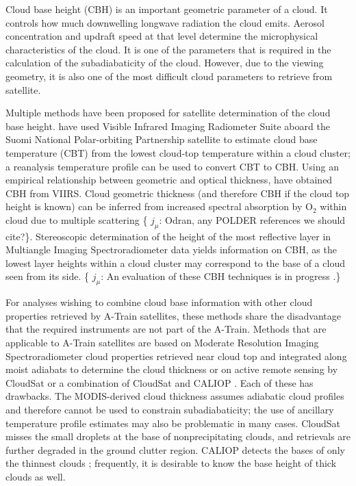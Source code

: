 \documentclass[essd,manuscript]{copernicus}\usepackage[]{graphicx}\usepackage[]{color}
\newcommand{\hlnum}[1]{\textcolor[rgb]{0.686,0.059,0.569}{#1}}%
\newcommand\comment[2]{\{\hlnum{ \textit{#1}: #2}\}}
\newcommand\commentjm[1]{\comment{$j_\mu$}{#1}}
\begin{document}
\introduction  %
\label{sec:intro}
Cloud base height (CBH) is an important geometric parameter of a cloud.  It
controls how much downwelling longwave radiation the cloud emits.  Aerosol
concentration and updraft speed at that level determine the microphysical
characteristics of the cloud.  It is one of the parameters that is required in
the calculation of the subadiabaticity of the cloud.  However, due to the
viewing geometry, it is also one of the most difficult cloud parameters to
retrieve from satellite.

Multiple methods have been proposed for satellite determination of the cloud
base height.  \cite{Zhu2014} have used Visible Infrared Imaging Radiometer Suite
aboard the Suomi National Polar-orbiting Partnership satellite
\citep[VIIRS,][]{Cao2014} to estimate cloud base temperature (CBT) from the
lowest cloud-top temperature within a cloud cluster; a reanalysis temperature
profile can be used to convert CBT to CBH.  Using an empirical relationship
between geometric and optical thickness, \cite{Fitch2016} have obtained CBH from
VIIRS.  Cloud geometric thickness (and therefore CBH if the cloud top height is
known) can be inferred from increased spectral absorption by O$_2$ within cloud
due to multiple scattering \citep{Kokhanovsky2005} \commentjm{Odran, any POLDER
  references we should cite?}.  Stereoscopic determination of
the height of the most reflective layer \cite{Naud2005,Naud2007} in Multiangle
Imaging Spectroradiometer data \citep[MISR,][]{Diner1998} yields information on
CBH, as the lowest layer heights within a cloud cluster may correspond to the
base of a cloud seen from its side.  \commentjm{An evaluation of these CBH
  techniques is in progress \citep{Boehm2017}.}

For analyses wishing to combine cloud base information with other cloud
properties retrieved by A-Train satellites, these methods share the disadvantage
that the required instruments are not part of the A-Train.  Methods that are
applicable to A-Train satellites are based on Moderate Resolution Imaging
Spectroradiometer \citep[MODIS,][]{Platnick2017} cloud properties retrieved near
cloud top and integrated along moist adiabats to determine the cloud thickness
\citep{Meerkoetter2007} or on active remote sensing by CloudSat
\citep[2B-GEOPROF,][]{Marchand2008} or a combination of CloudSat and CALIOP
\citep[2B-GEOPROF-LIDAR,][]{Mace2014}.  Each of these has drawbacks.  The
MODIS-derived cloud thickness assumes adiabatic cloud profiles and therefore
cannot be used to constrain subadiabaticity; the use of ancillary temperature
profile estimates may also be problematic in many cases.  CloudSat misses the
small droplets at the base of nonprecipitating clouds, and retrievals are
further degraded in the ground clutter region.  CALIOP detects the bases of only
the thinnest clouds \citep[$\tau < 5$,][]{Mace2014}; frequently, it is desirable
to know the base height of thick clouds as well.
\end{document}
